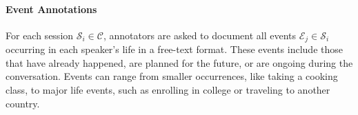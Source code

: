 \paragraph{Event Annotations}
For each session \( \mathcal{S}_i \in \mathcal{C} \), annotators are asked to document all events \( \mathcal{E}_j \in \mathcal{S}_i \) occurring in each speaker’s life in a free-text format. 
These events include those that have already happened, are planned for the future, or are ongoing during the conversation. 
Events can range from smaller occurrences, like taking a cooking class, to major life events, such as enrolling in college or traveling to another country.


